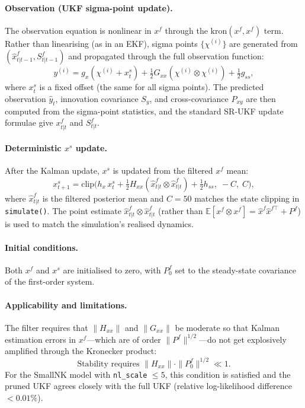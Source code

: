 \documentclass[11pt,a4paper]{article}
\theoremstyle{definition}
\newcommand{\E}{\mathbb{E}}
\newcommand{\code}[1]{\texttt{\color{codecolor}#1}}
\begin{document}
	\paragraph{Observation (UKF sigma-point update).}
	The observation equation is nonlinear in $x^f$ through the $\text{kron}(x^f, x^f)$ term.
	Rather than linearising (as in an EKF), sigma points $\{\chi^{(i)}\}$ are generated from $(\hat{x}^f_{t|t-1}, S^f_{t|t-1})$ and propagated through the full observation function:
	\begin{equation}\label{eq:pukf_obs}
		y^{(i)} = g_x(\chi^{(i)} + x^s_t) + \tfrac{1}{2} G_{xx}(\chi^{(i)} \otimes \chi^{(i)}) + \tfrac{1}{2} g_{ss},
	\end{equation}
	where $x^s_t$ is a fixed offset (the same for all sigma points).
	The predicted observation $\hat{y}_t$, innovation covariance $S_y$, and cross-covariance $P_{xy}$ are then computed from the sigma-point statistics, and the standard SR-UKF update formulae give $x^f_{t|t}$ and $S^f_{t|t}$.
	
	\paragraph{Deterministic $x^s$ update.}
	After the Kalman update, $x^s$ is updated from the filtered $x^f$ mean:
	\begin{equation}\label{eq:pukf_xs}
		x^s_{t+1} = \text{clip}\!\Big(h_x \, x^s_t + \tfrac{1}{2} H_{xx}(\hat{x}^f_{t|t} \otimes \hat{x}^f_{t|t}) + \tfrac{1}{2} h_{ss},\; -C,\; C\Big),
	\end{equation}
	where $\hat{x}^f_{t|t}$ is the filtered posterior mean and $C = 50$ matches the state clipping in \code{simulate()}.
	The point estimate $\hat{x}^f_{t|t} \otimes \hat{x}^f_{t|t}$ (rather than $\E[x^f \otimes x^f] = \hat{x}^f \hat{x}^{f\top} + P^f$) is used to match the simulation's realised dynamics.
	
	\paragraph{Initial conditions.}
	Both $x^f$ and $x^s$ are initialised to zero, with $P^f_0$ set to the steady-state covariance of the first-order system.
	
	\paragraph{Applicability and limitations.}
	The filter requires that $\|H_{xx}\|$ and $\|G_{xx}\|$ be moderate so that Kalman estimation errors in $x^f$---which are of order $\|P^f\|^{1/2}$---do not get explosively amplified through the Kronecker product:
	\begin{equation}\label{eq:pukf_stability}
		\text{Stability requires } \|H_{xx}\| \cdot \|P^f_0\|^{1/2} \ll 1.
	\end{equation}
	For the SmallNK model with \code{nl\_scale} $\leq 5$, this condition is satisfied and the pruned UKF agrees closely with the full UKF (relative log-likelihood difference $< 0.01\%$).
\end{document}
